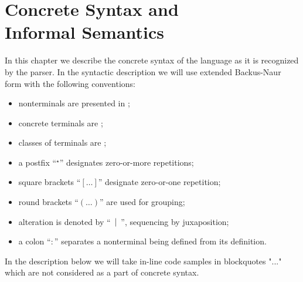 \chapter{Concrete Syntax and\\
Informal Semantics}
\label{sec:concrete_syntax}

In this chapter we describe the concrete syntax of the language as it is recognized by the parser. In the
syntactic description we will use extended Backus-Naur form with the following conventions:

\begin{itemize}
\item nonterminals are presented in ;
\item concrete terminals are ;
\item classes of terminals are ;
\item a postfix ``$^\star$'' designates zero-or-more repetitions;
\item square brackets ``$[\dots]$'' designate zero-or-one repetition;
\item round brackets ``$(\dots)$'' are used for grouping;
\item alteration is denoted by ``$\:\:\mid\:\:$'', sequencing by juxaposition;
\item a colon ``$:$'' separates a nonterminal being defined from its definition.
\end{itemize}

In the description below we will take in-line code samples in blockquotes "..." which are not considered as a
part of concrete syntax.








